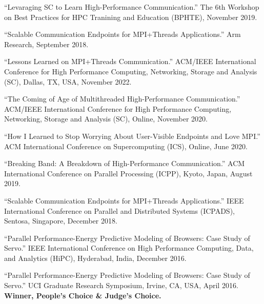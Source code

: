 \documentclass[11pt,article,oneside]{memoir}
\begin{document}
\ind ``Levaraging SC to Learn High-Performance Communication.'' The 6th Workshop on Best Practices for HPC Tranining and Education (BPHTE), November 2019.
\vspace{0.01in}

\ind ``Scalable Communication Endpoints for MPI+Threads Applications.'' Arm Research, September 2018.

\newpage

\medskip

\ind ``Lessons Learned on MPI+Threads Communication.'' ACM/IEEE International Conference for High Performance Computing, Networking, Storage and Analysis (SC), Dallas, TX, USA, November 2022.
\vspace{0.01in}

\ind ``The Coming of Age of Multithreaded High-Performance Communication.'' ACM/IEEE International Conference for High Performance Computing, Networking, Storage and Analysis (SC), Online, November 2020.
\vspace{0.01in}

\ind ``How I Learned to Stop Worrying About User-Visible Endpoints and Love MPI.'' ACM International Conference on Supercomputing (ICS), Online, June 2020.
\vspace{0.01in}

\ind ``Breaking Band: A Breakdown of High-Performance Communication.'' ACM International Conference on Parallel Processing (ICPP), Kyoto, Japan, August 2019. 
\vspace{0.01in}
 
\ind ``Scalable Communication Endpoints for MPI+Threads Applications.'' IEEE International Conference on Parallel and Distributed Systems (ICPADS), Sentosa, Singapore, December 2018. 
\vspace{0.01in}

\ind ``Parallel Performance-Energy Predictive Modeling of Browsers: Case Study of Servo.'' IEEE International Conference on High Performance Computing, Data, and Analytics (HiPC), Hyderabad, India, December 2016. 


\medskip

\ind ``Parallel Performance-Energy Predictive Modeling of Browsers: Case Study of Servo.'' UCI Graduate Research Symposium, Irvine, CA, USA, April 2016. \textbf{\textcolor{nice-purple}{Winner, People's Choice \& Judge's Choice.}}

\end{document}
